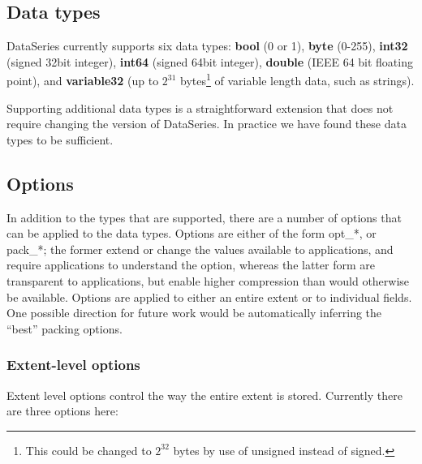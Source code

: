 \subsection{Data types}

DataSeries currently supports six data types:
\textbf{bool} (0 or 1),
\textbf{byte} (0-255),
\textbf{int32} (signed 32bit integer),
\textbf{int64} (signed 64bit integer),
\textbf{ double} (IEEE 64 bit floating point), and
\textbf{variable32} (up to $2^{31}$ bytes\footnote{This could be changed to $2^{32}$ bytes by use of unsigned instead of signed.} of variable length data, such as strings).

Supporting additional data types is a straightforward extension that
does not require changing the version of DataSeries.  In practice we
have found these data types to be sufficient.

\subsection{Options}\label{sec:options}

In addition to the types that are supported, there are a number of
options that can be applied to the data types.  Options are either of
the form opt\_*, or pack\_*; the former extend or change the values
available to applications, and require applications to understand the
option, whereas the latter form are transparent to applications, but
enable higher compression than would otherwise be available. Options
are applied to either an entire extent or to individual fields.  One
possible direction for future work would be automatically inferring
the ``best'' packing options.

\subsubsection{Extent-level options}
\label{sec:design:extent-options}

Extent level options control the way the entire extent is stored.
Currently there are three options here:

